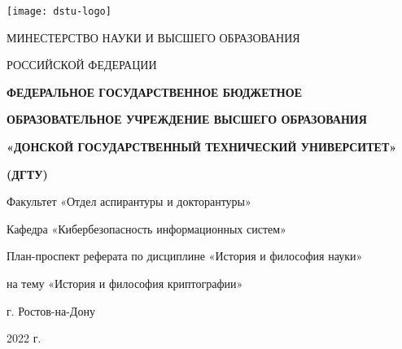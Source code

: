 \begin{titlepage}
	\centerline{\texttt{[image: dstu-logo]}}
	\vfill
	\centerline{МИНЕСТЕРСТВО НАУКИ И ВЫСШЕГО ОБРАЗОВАНИЯ}
	\centerline{РОССИЙСКОЙ ФЕДЕРАЦИИ}
	\vfill
	\centerline{\bf ФЕДЕРАЛЬНОЕ ГОСУДАРСТВЕННОЕ БЮДЖЕТНОЕ}
	\centerline{\bf ОБРАЗОВАТЕЛЬНОЕ УЧРЕЖДЕНИЕ ВЫСШЕГО ОБРАЗОВАНИЯ}
	\centerline{\bf «ДОНСКОЙ ГОСУДАРСТВЕННЫЙ ТЕХНИЧЕСКИЙ УНИВЕРСИТЕТ»}
	\centerline{\bf (ДГТУ)}
	\normalsize
	\vfill\vfill
	\centerline{Факультет «Отдел аспирантуры и докторантуры»}
	\centerline{Кафедра «Кибербезопасность информационных систем»}
	\vfill
	\vfill
	\centerline{План-проспект реферата по дисциплине «История и философия науки»}
	\centerline{на тему «История и философия криптографии»}
	\vfill
	\vfill
	\vfill
	\vfill
	\vfill
	\vfill
	\vfill
	\vfill
	\vfill
	
	\centerline{г. Ростов-на-Дону}
	\centerline{2022 г.}
	
\end{titlepage}
\setcounter{page}{2}